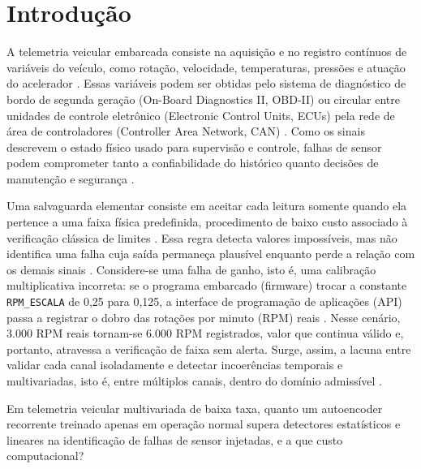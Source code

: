 \documentclass[conference]{IEEEtran}
\begin{document}
\section{Introdução}

A telemetria veicular embarcada consiste na aquisição e no registro contínuos de variáveis do veículo, como rotação, velocidade, temperaturas, pressões e atuação do acelerador \cite{weber2023automotive,kang2016intrusion}.
Essas variáveis podem ser obtidas pelo sistema de diagnóstico de bordo de segunda geração (On-Board Diagnostics II, OBD-II) ou circular entre unidades de controle eletrônico (Electronic Control Units, ECUs) pela rede de área de controladores (Controller Area Network, CAN) \cite{weber2023automotive,kang2016intrusion}.
Como os sinais descrevem o estado físico usado para supervisão e controle, falhas de sensor podem comprometer tanto a confiabilidade do histórico quanto decisões de manutenção e segurança \cite{isermann2005model,kang2016intrusion}.

Uma salvaguarda elementar consiste em aceitar cada leitura somente quando ela pertence a uma faixa física predefinida, procedimento de baixo custo associado à verificação clássica de limites \cite{isermann2005model}.
Essa regra detecta valores impossíveis, mas não identifica uma falha cuja saída permaneça plausível enquanto perde a relação com os demais sinais \cite{isermann2005model,chandola2009anomaly}.
Considere-se uma falha de ganho, isto é, uma calibração multiplicativa incorreta: se o programa embarcado (firmware) trocar a constante \texttt{RPM\_ESCALA} de 0,25 para 0,125, a interface de programação de aplicações (API) passa a registrar o dobro das rotações por minuto (RPM) reais \cite{evangelista2026sensorfaults}.
Nesse cenário, 3.000 RPM reais tornam-se 6.000 RPM registrados, valor que continua válido e, portanto, atravessa a verificação de faixa sem alerta.
Surge, assim, a lacuna entre validar cada canal isoladamente e detectar incoerências temporais e multivariadas, isto é, entre múltiplos canais, dentro do domínio admissível \cite{chandola2009anomaly,malhotra2016lstm}.

Em telemetria veicular multivariada de baixa taxa, quanto um autoencoder recorrente treinado apenas em operação normal supera detectores estatísticos e lineares na identificação de falhas de sensor injetadas, e a que custo computacional?
\end{document}
